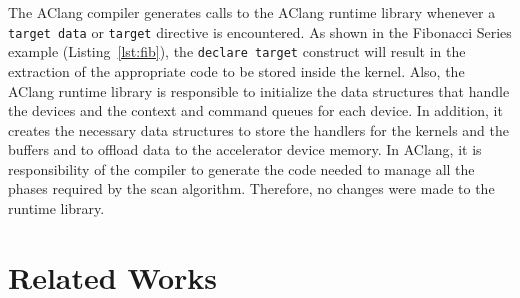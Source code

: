 \documentclass[Ingles]{ic-tese-v1}
\newcommand{\ttt}[1]{{\texttt{#1}}}
\newcommand{\rlst}[1]{Listing~\ref{lst:#1}}
\begin{document}
The AClang compiler generates calls to  the AClang runtime library whenever a
\ttt{target data}  or \ttt{target}  directive is encountered.   As shown  in  the Fibonacci
Series example (\rlst{fib}),  the \ttt{declare  target}
construct will result in the extraction  of the appropriate code to be
stored  inside  the  kernel.  Also,  the  AClang  runtime  library  is
responsible to initialize the data  structures that handle the devices
and the context  and command queues for each device.   In addition, it
creates the  necessary data structures  to store the handlers  for the
kernels and the buffers and to offload data to the accelerator device
memory.  In AClang, it is responsibility of the compiler to generate
the  code needed  to manage  all the  phases required by  the scan  algorithm.
Therefore, no changes were made to the runtime library.

\chapter{Related Works}
\label{cap:RelatedWorks}
\end{document}
